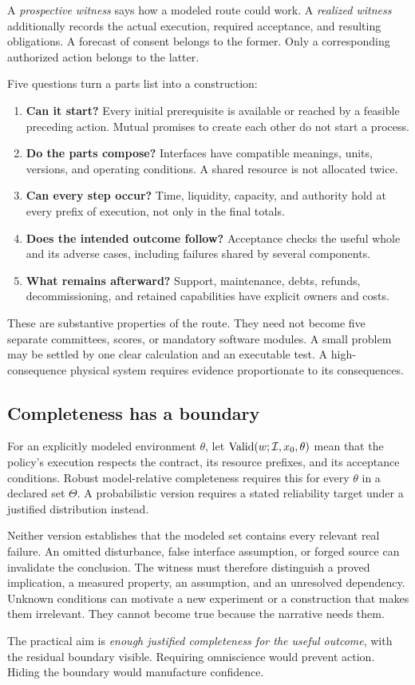 A \emph{prospective witness} says how a modeled route could work. A \emph{realized witness} additionally records the actual execution, required acceptance, and resulting obligations. A forecast of consent belongs to the former. Only a corresponding authorized action belongs to the latter.

Five questions turn a parts list into a construction:
\begin{enumerate}
\item \textbf{Can it start?} Every initial prerequisite is available or reached by a feasible preceding action. Mutual promises to create each other do not start a process.
\item \textbf{Do the parts compose?} Interfaces have compatible meanings, units, versions, and operating conditions. A shared resource is not allocated twice.
\item \textbf{Can every step occur?} Time, liquidity, capacity, and authority hold at every prefix of execution, not only in the final totals.
\item \textbf{Does the intended outcome follow?} Acceptance checks the useful whole and its adverse cases, including failures shared by several components.
\item \textbf{What remains afterward?} Support, maintenance, debts, refunds, decommissioning, and retained capabilities have explicit owners and costs.
\end{enumerate}

These are substantive properties of the route. They need not become five separate committees, scores, or mandatory software modules. A small problem may be settled by one clear calculation and an executable test. A high-consequence physical system requires evidence proportionate to its consequences.

\subsection{Completeness has a boundary}

For an explicitly modeled environment $\theta$, let $\operatorname{Valid}(w;\mathcal{I},x_0,\theta)$ mean that the policy's execution respects the contract, its resource prefixes, and its acceptance conditions. Robust model-relative completeness requires this for every $\theta$ in a declared set $\Theta$. A probabilistic version requires a stated reliability target under a justified distribution instead.

Neither version establishes that the modeled set contains every relevant real failure. An omitted disturbance, false interface assumption, or forged source can invalidate the conclusion. The witness must therefore distinguish a proved implication, a measured property, an assumption, and an unresolved dependency. Unknown conditions can motivate a new experiment or a construction that makes them irrelevant. They cannot become true because the narrative needs them.

The practical aim is \emph{enough justified completeness for the useful outcome}, with the residual boundary visible. Requiring omniscience would prevent action. Hiding the boundary would manufacture confidence.
